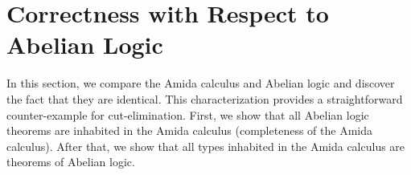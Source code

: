 


\section{Correctness with Respect to Abelian Logic}
\label{correct-abelian}

In this section, we compare the Amida calculus and Abelian logic and
discover the fact that they are identical.
This characterization provides a straightforward counter-example for
cut-elimination.
First, we show that all Abelian logic theorems are inhabited in the Amida
calculus (completeness of the Amida calculus).
After that, we show that all types inhabited in the Amida calculus are
theorems of Abelian logic.

